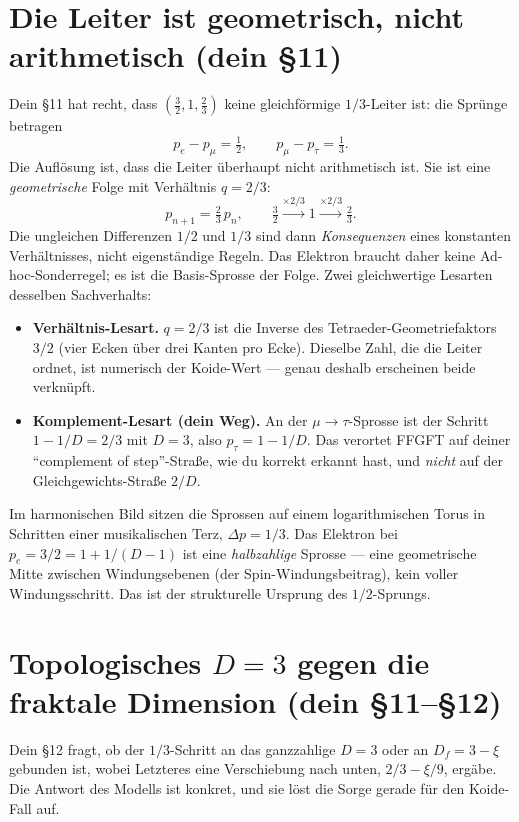 \section{Die Leiter ist geometrisch, nicht arithmetisch (dein \S11)}

Dein \S11 hat recht, dass $\left(\tfrac{3}{2}, 1, \tfrac{2}{3}\right)$ keine
gleichförmige $1/3$-Leiter ist: die Sprünge betragen
\[
  p_e - p_\mu = \tfrac{1}{2}, \qquad p_\mu - p_\tau = \tfrac{1}{3}.
\]
Die Auflösung ist, dass die Leiter überhaupt nicht arithmetisch ist. Sie ist
eine \emph{geometrische} Folge mit Verhältnis $q = 2/3$:
\[
  p_{n+1} = \tfrac{2}{3}\,p_n,
  \qquad
  \tfrac{3}{2} \xrightarrow{\times 2/3} 1 \xrightarrow{\times 2/3} \tfrac{2}{3}.
\]
Die ungleichen Differenzen $1/2$ und $1/3$ sind dann \emph{Konsequenzen}
eines konstanten Verhältnisses, nicht eigenständige Regeln. Das Elektron
braucht daher keine Ad-hoc-Sonderregel; es ist die Basis-Sprosse der Folge.
Zwei gleichwertige Lesarten desselben Sachverhalts:

\begin{itemize}
  \item \textbf{Verhältnis-Lesart.} $q = 2/3$ ist die Inverse des
        Tetraeder-Geometriefaktors $3/2$ (vier Ecken über drei Kanten pro
        Ecke). Dieselbe Zahl, die die Leiter ordnet, ist numerisch der
        Koide-Wert --- genau deshalb erscheinen beide verknüpft.
  \item \textbf{Komplement-Lesart (dein Weg).} An der $\mu\!\to\!\tau$-Sprosse
        ist der Schritt $1 - 1/D = 2/3$ mit $D = 3$, also
        $p_\tau = 1 - 1/D$. Das verortet FFGFT auf deiner ``complement of
        step''-Straße, wie du korrekt erkannt hast, und \emph{nicht} auf der
        Gleichgewichts-Straße $2/D$.
\end{itemize}

Im harmonischen Bild sitzen die Sprossen auf einem logarithmischen Torus in
Schritten einer musikalischen Terz, $\Delta p = 1/3$. Das Elektron bei
$p_e = 3/2 = 1 + 1/(D-1)$ ist eine \emph{halbzahlige} Sprosse --- eine
geometrische Mitte zwischen Windungsebenen (der Spin-Windungsbeitrag), kein
voller Windungsschritt. Das ist der strukturelle Ursprung des
$1/2$-Sprungs.

\section{Topologisches $D=3$ gegen die fraktale Dimension (dein \S11--\S12)}

Dein \S12 fragt, ob der $1/3$-Schritt an das ganzzahlige $D=3$ oder an
$D_f = 3-\xi$ gebunden ist, wobei Letzteres eine Verschiebung nach unten,
$2/3 - \xi/9$, ergäbe. Die Antwort des Modells ist konkret, und sie löst die
Sorge gerade für den Koide-Fall auf.

